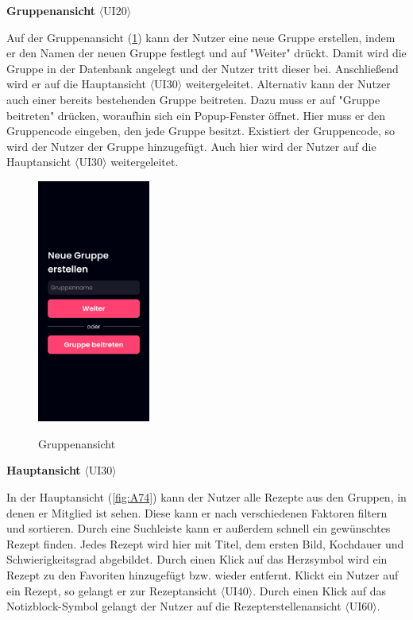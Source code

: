 \documentclass[parskip=full]{scrartcl}
\begin{document}
\textbf{Gruppenansicht} $\langle$UI20$\rangle$

Auf der Gruppenansicht (\ref{fig:A73}) kann der Nutzer eine neue Gruppe erstellen, indem er den Namen der neuen Gruppe festlegt und auf "Weiter" drückt. Damit wird die Gruppe in der Datenbank angelegt und der Nutzer tritt dieser bei. Anschließend wird er auf die Hauptansicht $\langle$UI30$\rangle$ weitergeleitet. Alternativ kann der Nutzer auch einer bereits bestehenden Gruppe beitreten. Dazu muss er auf "Gruppe beitreten" drücken, woraufhin sich ein Popup-Fenster öffnet. Hier muss er den Gruppencode eingeben, den jede Gruppe besitzt. Existiert der Gruppencode, so wird der Nutzer der Gruppe hinzugefügt. Auch hier wird der Nutzer auf die Hauptansicht $\langle$UI30$\rangle$ weitergeleitet.

\begin{figure}[!htp]
    \centering
    \includegraphics[height=80mm]{images/section7/GroupView.jpg}
    \label{fig:A73}
    \caption{Gruppenansicht}
\end{figure}
\newpage
\textbf{Hauptansicht} $\langle$UI30$\rangle$

In der Hauptansicht (\ref{fig:A74}) kann der Nutzer alle Rezepte aus den Gruppen, in denen er Mitglied ist sehen. Diese kann er nach verschiedenen Faktoren filtern und sortieren. Durch eine Suchleiste kann er außerdem schnell ein gewünschtes Rezept finden. Jedes Rezept wird hier mit Titel, dem ersten Bild, Kochdauer und Schwierigkeitsgrad abgebildet. Durch einen Klick auf das Herzsymbol wird ein Rezept zu den Favoriten hinzugefügt bzw. wieder entfernt. Klickt ein Nutzer auf ein Rezept, so gelangt er zur Rezeptansicht $\langle$UI40$\rangle$. Durch einen Klick auf das Notizblock-Symbol gelangt der Nutzer auf die Rezepterstellenansicht $\langle$UI60$\rangle$.
\end{document}
